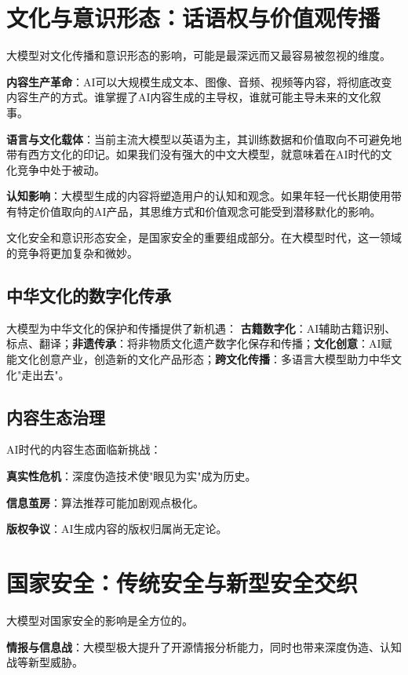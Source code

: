 \section{文化与意识形态：话语权与价值观传播}

大模型对文化传播和意识形态的影响，可能是最深远而又最容易被忽视的维度。

\textbf{内容生产革命}：AI可以大规模生成文本、图像、音频、视频等内容，将彻底改变内容生产的方式。谁掌握了AI内容生成的主导权，谁就可能主导未来的文化叙事。

\textbf{语言与文化载体}：当前主流大模型以英语为主，其训练数据和价值取向不可避免地带有西方文化的印记。如果我们没有强大的中文大模型，就意味着在AI时代的文化竞争中处于被动。

\textbf{认知影响}：大模型生成的内容将塑造用户的认知和观念。如果年轻一代长期使用带有特定价值取向的AI产品，其思维方式和价值观念可能受到潜移默化的影响。

文化安全和意识形态安全，是国家安全的重要组成部分。在大模型时代，这一领域的竞争将更加复杂和微妙。

\subsection{中华文化的数字化传承}

大模型为中华文化的保护和传播提供了新机遇：
\textbf{古籍数字化}：AI辅助古籍识别、标点、翻译；\textbf{非遗传承}：将非物质文化遗产数字化保存和传播；\textbf{文化创意}：AI赋能文化创意产业，创造新的文化产品形态；\textbf{跨文化传播}：多语言大模型助力中华文化"走出去"。

\subsection{内容生态治理}

AI时代的内容生态面临新挑战：

\textbf{真实性危机}：深度伪造技术使"眼见为实"成为历史。

\textbf{信息茧房}：算法推荐可能加剧观点极化。

\textbf{版权争议}：AI生成内容的版权归属尚无定论。

\section{国家安全：传统安全与新型安全交织}

大模型对国家安全的影响是全方位的。

\textbf{情报与信息战}：大模型极大提升了开源情报分析能力，同时也带来深度伪造、认知战等新型威胁。

